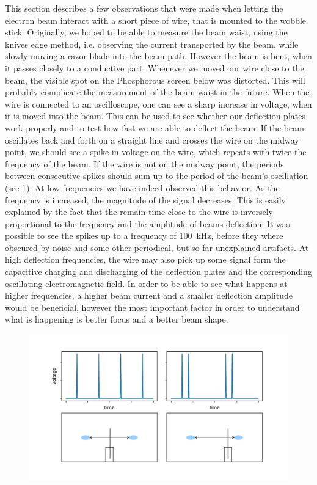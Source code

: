 This section describes a few observations that were made when letting the electron beam interact with a short piece of wire, that is mounted to the wobble stick. Originally, we hoped to be able to measure the beam waist, using the knives edge method, i.e. observing the current transported by the beam, while slowly moving a razor blade into the beam path. However the beam is bent, when it passes closely to a conductive part. Whenever we moved our wire close to the beam, the visible spot on the Phosphorous screen below was distorted. This will probably complicate the measurement of the beam waist in the future. 
When the wire is connected to an oscilloscope, one can see a sharp increase in voltage, when it is moved into the beam. This can be used to see whether our deflection plates work properly and to test how fast we are able to deflect the beam. If the beam oscillates back and forth on a straight line and crosses the wire on the midway point, we should see a spike in voltage on the wire, which repeats with twice the frequency of the beam. If the wire is not on the midway point, the periods between consecutive spikes should sum up to the period of the beam's oscillation (see \cref{fig:spikes}). At low frequencies we have indeed observed this behavior. As the frequency is increased, the magnitude of the signal decreases. This is easily explained by the fact that the remain time close to the wire is inversely proportional to the frequency and the amplitude of beams deflection. It was possible to see the spikes up to a frequency of \SI{100}{\kilo\hertz}, before they where obscured by noise and some other periodical, but so far unexplained artifacts.
At high deflection frequencies, the wire may also pick up some signal form the capacitive charging and discharging of the deflection plates and the corresponding oscillating electromagnetic field.
In order to be able to see what happens at higher frequencies, a higher beam current and a smaller deflection amplitude would be beneficial, however the most important factor in order to understand what is happening is better focus and a better beam shape.

\begin{figure}
	\centering
	\includegraphics[width=0.8\linewidth]{Chapters/beam-characterization/Spikes}
	\caption{}
	\label{fig:spikes}
\end{figure}

